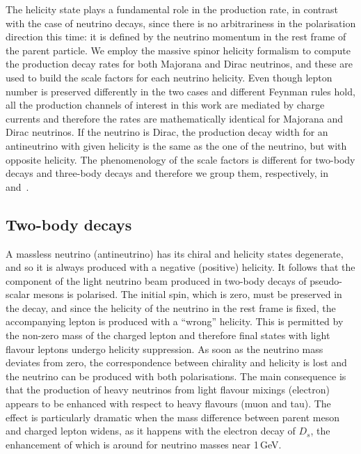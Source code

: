The helicity state plays a fundamental role in the production rate, in contrast with the case of neutrino decays, %
since there is no arbitrariness in the polarisation direction this time: %
it is defined by the neutrino momentum in the rest frame of the parent particle.
We employ the massive spinor helicity formalism to compute the production decay rates for both Majorana and Dirac neutrinos, %
and these are used to build the scale factors for each neutrino helicity.
Even though lepton number is preserved differently in the two cases and different Feynman rules hold, %
all the production channels of interest in this work are mediated by charge currents %
and therefore the rates are mathematically identical for Majorana and Dirac neutrinos.
If the neutrino is Dirac, the production decay width for an antineutrino with given helicity is the same %
as the one of the neutrino, but with opposite helicity.
The phenomenology of the scale factors is different for two-body decays and three-body decays and therefore we group them, %
respectively, in~ and~.

\subsection{Two-body decays}
\label{sec:production_2body}

A massless neutrino (antineutrino) has its chiral and helicity states degenerate, and so %
it is always produced with a negative (positive) helicity.
It follows that the component of the light neutrino beam produced in two-body decays of pseudo-scalar mesons is polarised.
The initial spin, which is zero, must be preserved in the decay, and since the helicity of the neutrino in the rest frame %
is fixed, the accompanying lepton is produced with a ``wrong'' helicity.
This is permitted by the non-zero mass of the charged lepton and %
therefore final states with light flavour leptons undergo helicity suppression.
As soon as the neutrino mass deviates from zero, the correspondence between chirality and helicity is lost %
and the neutrino can be produced with both polarisations.
The main consequence is that the production of heavy neutrinos from light flavour mixings (electron) appears to be enhanced with %
respect to heavy flavours (muon and tau).
The effect is particularly dramatic when the mass difference between parent meson and charged lepton widens, %
as it happens with the electron decay of $D_s$, the enhancement of which is around  for neutrino masses near 1\,GeV.

